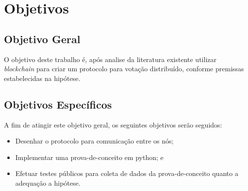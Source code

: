 \chapter{Objetivos}
\section{Objetivo Geral}
O objetivo deste trabalho é, após analise da literatura existente utilizar \textit{blockchain} para criar um protocolo para votação distribuído, conforme premissas estabelecidas na hipótese.

\section{Objetivos Específicos}
A fim de atingir este objetivo geral, os seguintes objetivos serão seguidos:

\begin{itemize}
	\item Desenhar o protocolo para comunicação entre os nós;
	\item Implementar uma prova-de-conceito em python; e
	\item Efetuar testes públicos para coleta de dados da prova-de-conceito quanto a adequação a hipótese.
\end{itemize}


